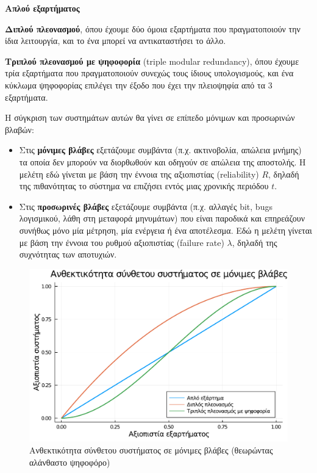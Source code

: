 \documentclass[a4paper,nobib]{tufte-book}
\begin{document}
\begin{compactenum}
	\item \textbf{Απλού εξαρτήματος}
	\item \textbf{Διπλού πλεονασμού}, όπου έχουμε δύο όμοια εξαρτήματα που πραγματοποιούν την ίδια λειτουργία, και το ένα μπορεί να αντικαταστήσει το άλλο.
	\item \textbf{Τριπλού πλεονασμού με ψηφοφορία} (triple modular redundancy), όπου έχουμε τρία εξαρτήματα που πραγματοποιούν συνεχώς τους ίδιους υπολογισμούς, και ένα κύκλωμα ψηφοφορίας επιλέγει την έξοδο που έχει την πλειοψηφία από τα 3 εξαρτήματα.
\end{compactenum}

Η σύγκριση των συστημάτων αυτών θα γίνει σε επίπεδο μόνιμων και προσωρινών βλαβών:

\begin{itemize}
	\item Στις \textbf{μόνιμες βλάβες} εξετάζουμε συμβάντα (π.χ. ακτινοβολία, απώλεια μνήμης) τα οποία δεν μπορούν να διορθωθούν και οδηγούν σε απώλεια της αποστολής. Η μελέτη εδώ γίνεται με βάση την έννοια της αξιοπιστίας (reliability) \( R \), δηλαδή της πιθανότητας το σύστημα να επιζήσει εντός μιας χρονικής περιόδου \( t \).
	\item Στις \textbf{προσωρινές βλάβες} εξετάζουμε συμβάντα (π.χ. αλλαγές bit, bugs λογισμικού, λάθη στη μεταφορά μηνυμάτων) που είναι παροδικά και επηρεάζουν συνήθως μόνο μία μέτρηση, μία ενέργεια ή ένα αποτέλεσμα. Εδώ η μελέτη γίνεται με βάση την έννοια του ρυθμού αξιοπιστίας (failure rate) \( \lambda \), δηλαδή της συχνότητας των αποτυχιών.
\end{itemize}


\begin{figure}
	\centering
	\includegraphics{analysis/reliability_norepair}
	\caption{Ανθεκτικότητα σύνθετου συστήματος σε μόνιμες βλάβες (θεωρώντας αλάνθαστο ψηφοφόρο)}
	\label{fig:reliability_norepair}
\end{figure}
\end{document}

